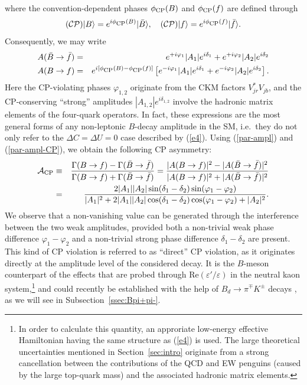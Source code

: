 \documentclass[11pt]{cernrep}
\begin{document}
where the convention-dependent phases $\phi_{\mbox{{\scriptsize CP}}}(B)$ 
and $\phi_{\mbox{{\scriptsize CP}}}(f)$ are defined through
\begin{equation}\label{CP-phase-def}
({\cal CP})\vert B\rangle=
e^{i\phi_{\mbox{{\scriptsize CP}}}(B)}
\vert\bar B\rangle, \quad 
({\cal CP})\vert f\rangle=
e^{i\phi_{\mbox{{\scriptsize CP}}}(f)}
\vert\bar f\rangle.
\end{equation}
Consequently, we may write
\begin{eqnarray}
A(\bar B\to\bar f)&=&e^{+i\varphi_1}
|A_1|e^{i\delta_1}+e^{+i\varphi_2}|A_2|e^{i\delta_2}\label{par-ampl}\\
A(B\to f)&=&e^{i[\phi_{\mbox{{\scriptsize CP}}}(B)-\phi_{\mbox{{\scriptsize CP}}}(f)]}
\left[e^{-i\varphi_1}|A_1|e^{i\delta_1}+e^{-i\varphi_2}|A_2|e^{i\delta_2}
\right].\label{par-ampl-CP}
\end{eqnarray}
Here the CP-violating phases $\varphi_{1,2}$ originate from the CKM factors 
$V_{jr}^\ast V_{jb}$, and the CP-conserving ``strong'' amplitudes
$|A_{1,2}|e^{i\delta_{1,2}}$ involve the hadronic matrix elements of the 
four-quark operators. In fact, these expressions are the most general forms
of any non-leptonic $B$-decay amplitude in the SM, i.e.\ they do not only
refer to the $\Delta C=\Delta U=0$ case described by (\ref{e4}). 
Using (\ref{par-ampl}) and (\ref{par-ampl-CP}), we obtain
the following CP asymmetry:
\begin{eqnarray}
{\cal A}_{\rm CP}&\equiv&\frac{\Gamma(B\to f)-
\Gamma(\bar B\to\bar f)}{\Gamma(B\to f)+\Gamma(\bar B
\to \bar f)}=\frac{|A(B\to f)|^2-|A(\bar B\to \bar f)|^2}{|A(B\to f)|^2+
|A(\bar B\to \bar f)|^2}\nonumber\\
&=&\frac{2|A_1||A_2|\sin(\delta_1-\delta_2)
\sin(\varphi_1-\varphi_2)}{|A_1|^2+2|A_1||A_2|\cos(\delta_1-\delta_2)
\cos(\varphi_1-\varphi_2)+|A_2|^2}.\label{direct-CPV}
\end{eqnarray}
We observe that a non-vanishing value can be generated through the 
interference between the two weak amplitudes, provided both a non-trivial 
weak phase difference $\varphi_1-\varphi_2$ and a non-trivial strong phase 
difference $\delta_1-\delta_2$ are present. This kind of
CP violation is referred to as ``direct'' CP violation, as it originates 
directly at the amplitude level of the considered decay. It is the 
$B$-meson counterpart of the effects that are probed through 
$\mbox{Re}(\varepsilon'/\varepsilon)$ in the neutral kaon 
system,\footnote{In order to calculate this quantity, an approriate 
low-energy effective Hamiltonian having the same structure as (\ref{e4}) 
is used. The large theoretical uncertainties mentioned in Section~\ref{sec:intro} 
originate from a strong cancellation 
between the contributions of the QCD and EW penguins (caused by the
large top-quark mass) and the associated
hadronic matrix elements.} and could recently be established with the help of 
$B_d\to\pi^\mp K^\pm$ decays \cite{CP-B-dir}, as we will see in
Subsection~\ref{ssec:Bpi+pi-}.
\end{document}
